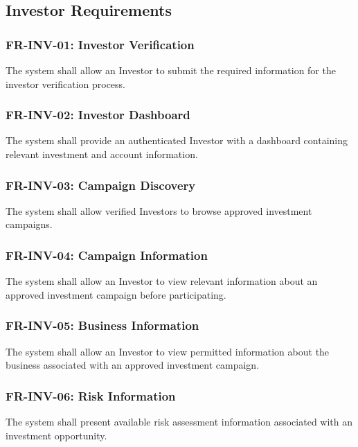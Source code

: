 \subsection{Investor Requirements}

\subsubsection{FR-INV-01: Investor Verification}

The system shall allow an Investor to submit the required information for
the investor verification process.

\subsubsection{FR-INV-02: Investor Dashboard}

The system shall provide an authenticated Investor with a dashboard
containing relevant investment and account information.

\subsubsection{FR-INV-03: Campaign Discovery}

The system shall allow verified Investors to browse approved investment
campaigns.

\subsubsection{FR-INV-04: Campaign Information}

The system shall allow an Investor to view relevant information about an
approved investment campaign before participating.

\subsubsection{FR-INV-05: Business Information}

The system shall allow an Investor to view permitted information about the
business associated with an approved investment campaign.

\subsubsection{FR-INV-06: Risk Information}

The system shall present available risk assessment information associated
with an investment opportunity.

